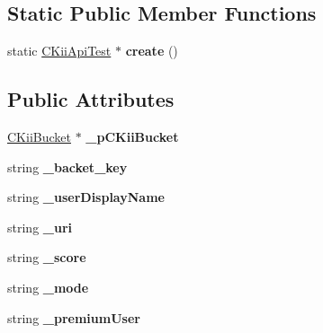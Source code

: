 \subsection*{Static Public Member Functions}
\begin{DoxyCompactItemize}
\item 
\hypertarget{class_c_kii_api_test_aa4017a64bbd9c903c257c638d8291ee6}{static \hyperlink{class_c_kii_api_test}{C\-Kii\-Api\-Test} $\ast$ {\bfseries create} ()}\label{class_c_kii_api_test_aa4017a64bbd9c903c257c638d8291ee6}

\end{DoxyCompactItemize}
\subsection*{Public Attributes}
\begin{DoxyCompactItemize}
\item 
\hypertarget{class_c_kii_api_test_a0efcca05f0b3d0f1528a4762257162a6}{\hyperlink{class_c_kii_bucket}{C\-Kii\-Bucket} $\ast$ {\bfseries \-\_\-p\-C\-Kii\-Bucket}}\label{class_c_kii_api_test_a0efcca05f0b3d0f1528a4762257162a6}

\item 
\hypertarget{class_c_kii_api_test_a89ebde6fedb62ffe5ed9f98e52cf6945}{string {\bfseries \-\_\-backet\-\_\-key}}\label{class_c_kii_api_test_a89ebde6fedb62ffe5ed9f98e52cf6945}

\item 
\hypertarget{class_c_kii_api_test_ad39e9b070aca7754a6c754ff5f769594}{string {\bfseries \-\_\-user\-Display\-Name}}\label{class_c_kii_api_test_ad39e9b070aca7754a6c754ff5f769594}

\item 
\hypertarget{class_c_kii_api_test_a2e9cdd55bde457920b81a0a0305e5da3}{string {\bfseries \-\_\-uri}}\label{class_c_kii_api_test_a2e9cdd55bde457920b81a0a0305e5da3}

\item 
\hypertarget{class_c_kii_api_test_a3d774834785707b2870f338cd5a1f60c}{string {\bfseries \-\_\-score}}\label{class_c_kii_api_test_a3d774834785707b2870f338cd5a1f60c}

\item 
\hypertarget{class_c_kii_api_test_aba900d1c916318386b8d6364ac9abf76}{string {\bfseries \-\_\-mode}}\label{class_c_kii_api_test_aba900d1c916318386b8d6364ac9abf76}

\item 
\hypertarget{class_c_kii_api_test_a819ad2cb6fa1387ce02f8c33aee4b8f6}{string {\bfseries \-\_\-premium\-User}}\label{class_c_kii_api_test_a819ad2cb6fa1387ce02f8c33aee4b8f6}

\end{DoxyCompactItemize}


